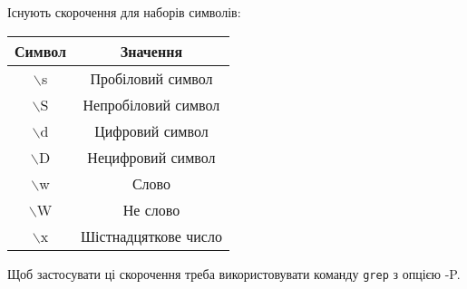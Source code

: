 \documentclass[t]{beamer}  %
\begin{document}
\begin{frame}
  \frametitle{\insertsection} 
	\framesubtitle{\insertsubsection}
	Існують скорочення для наборів символів:
	\begin{table}
	  \label{tab:}
	
	  \begin{center}
	    \begin{tabular}{|c|c|}
	    \hline
	      {\bf Символ} & {\bf Значення} \\
	       \hline
	       $\backslash$s & Пробіловий символ\\
	       \hline
	       $\backslash$S & Непробіловий символ\\
	       \hline
	       $\backslash$d & Цифровий символ\\
	       \hline
	       $\backslash$D & Нецифровий символ\\
	       \hline
	       $\backslash$w & Слово\\
	       \hline
	       $\backslash$W & Не слово\\
	       \hline
	       $\backslash$x & Шістнадцяткове число\\
	       \hline
	    \end{tabular}
	  \end{center}
	\end{table}
	Щоб застосувати ці скорочення треба використовувати команду \texttt{grep} з опцією -P.
\end{frame}
\end{document}
